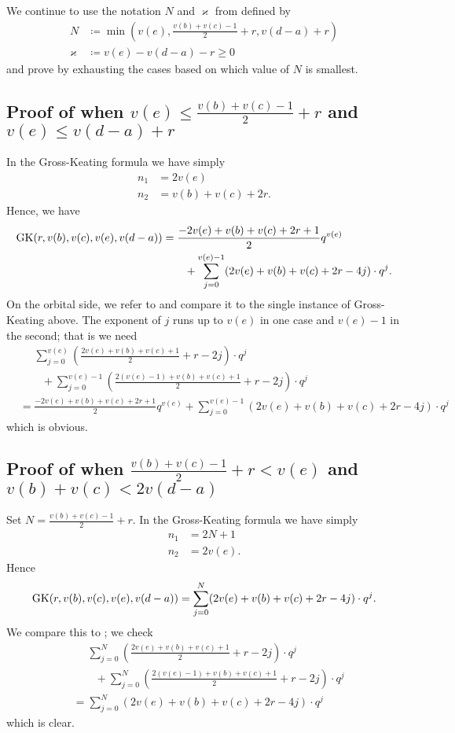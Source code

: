We continue to use the notation $N$ and $\varkappa$ from  defined by
\begin{align*}
  N &\coloneqq \min \left( v(e),
    \tfrac{v(b)+v(c)-1}{2} + r, v(d-a) + r \right) \\
  \varkappa &\coloneqq v(e) - v(d-a) - r \ge 0
\end{align*}
and prove  by exhausting the
cases based on which value of $N$ is smallest.

\subsection{Proof of 
  when $v(e) \le \tfrac{v(b)+v(c)-1}{2} + r$
  and $v(e) \le v(d-a) + r$}
In the Gross-Keating formula we have simply
\begin{align*}
  n_1 &= 2v(e) \\
  n_2 &= v(b) + v(c) + 2r.
\end{align*}
Hence, we have
\begin{align*}
  \operatorname{GK}(r, v(b), v(c), v(e), v(d-a))
  &= \frac{-2v(e)+v(b)+v(c)+2r+1}{2} q^{v(e)} \\
  &\qquad+ \sum_{j=0}^{v(e)-1} (2v(e)+v(b)+v(c)+2r-4j) \cdot q^j.
\end{align*}
On the orbital side, we refer to 
and compare it to the single instance of Gross-Keating above.
The exponent of $j$ runs up to $v(e)$ in one case and $v(e)-1$ in the second;
that is we need
\begin{align*}
  &\phantom= \sum_{j=0}^{v(e)} \left( \frac{2v(e)+v(b)+v(c)+1}{2} + r - 2j \right) \cdot q^j \\
  &\qquad+ \sum_{j=0}^{v(e)-1} \left( \frac{2(v(e)-1)+v(b)+v(c)+1}{2} + r - 2j \right) \cdot q^j \\
  &= \frac{-2v(e)+v(b)+v(c)+2r+1}{2} q^{v(e)}
  + \sum_{j=0}^{v(e)-1} (2v(e)+v(b)+v(c)+2r-4j) \cdot q^j
\end{align*}
which is obvious.

\subsection{Proof of 
  when $\tfrac{v(b)+v(c)-1}{2} + r < v(e)$
  and $v(b)+v(c) < 2v(d-a)$}

Set $N = \frac{v(b)+v(c)-1}{2} + r$.
In the Gross-Keating formula we have simply
\begin{align*}
  n_1 &= 2N+1 \\
  n_2 &= 2v(e).
\end{align*}
Hence
\[ \operatorname{GK}(r, v(b), v(c), v(e), v(d-a))
  = \sum_{j=0}^N (2v(e)+v(b)+v(c)+2r-4j) \cdot q^j. \]
We compare this to ; we check
\begin{align*}
  &\phantom= \sum_{j=0}^{N} \left( \frac{2v(e)+v(b)+v(c)+1}{2} + r - 2j \right) \cdot q^j \\
  &\qquad+ \sum_{j=0}^{N} \left( \frac{2(v(e)-1)+v(b)+v(c)+1}{2} + r - 2j \right) \cdot q^j \\
  &= \sum_{j=0}^N (2v(e)+v(b)+v(c)+2r-4j) \cdot q^j
\end{align*}
which is clear.

